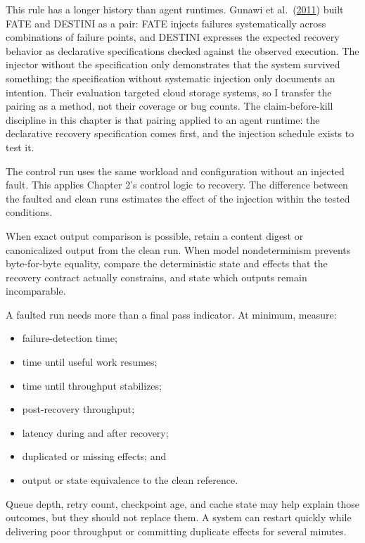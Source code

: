This rule has a longer history than agent runtimes. Gunawi et al.~(\href{https://www.usenix.org/conference/nsdi11/fate-and-destini-framework-cloud-recovery-testing}{2011}) built FATE and DESTINI as a pair: FATE injects failures systematically across combinations of failure points, and DESTINI expresses the expected recovery behavior as declarative specifications checked against the observed execution. The injector without the specification only demonstrates that the system survived something; the specification without systematic injection only documents an intention. Their evaluation targeted cloud storage systems, so I transfer the pairing as a method, not their coverage or bug counts. The claim-before-kill discipline in this chapter is that pairing applied to an agent runtime: the declarative recovery specification comes first, and the injection schedule exists to test it.

The control run uses the same workload and configuration without an injected fault. This applies Chapter 2's control logic to recovery. The difference between the faulted and clean runs estimates the effect of the injection within the tested conditions.

When exact output comparison is possible, retain a content digest or canonicalized output from the clean run. When model nondeterminism prevents byte-for-byte equality, compare the deterministic state and effects that the recovery contract actually constrains, and state which outputs remain incomparable.


A faulted run needs more than a final pass indicator. At minimum, measure:

\begin{itemize}
\tightlist
\item
  failure-detection time;
\item
  time until useful work resumes;
\item
  time until throughput stabilizes;
\item
  post-recovery throughput;
\item
  latency during and after recovery;
\item
  duplicated or missing effects; and
\item
  output or state equivalence to the clean reference.
\end{itemize}

Queue depth, retry count, checkpoint age, and cache state may help explain those outcomes, but they should not replace them. A system can restart quickly while delivering poor throughput or committing duplicate effects for several minutes.

